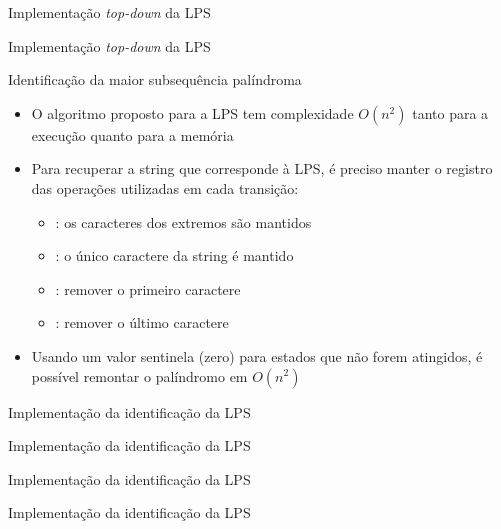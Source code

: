 \begin{frame}[fragile]{Implementação {\it top-down} da LPS}
\end{frame}

\begin{frame}[fragile]{Implementação {\it top-down} da LPS}
\end{frame}

\begin{frame}[fragile]{Identificação da maior subsequência palíndroma}

    \begin{itemize}
        \item O algoritmo proposto para a LPS tem complexidade $O(n^2)$ tanto para a execução 
            quanto para a memória
        \pause

        \item Para recuperar a string que corresponde à LPS, é preciso manter o registro das
            operações utilizadas em cada transição:
            \begin{itemize}
                \item {}: os caracteres dos extremos são mantidos
                \item {}: o único caractere da string é mantido
                \item {}: remover o primeiro caractere 
                \item {}: remover o último caractere 
            \end{itemize}
        \pause

        \item Usando um valor sentinela (zero) para estados que não forem atingidos, é possível
            remontar o palíndromo em $O(n^2)$
    \end{itemize}

\end{frame}

\begin{frame}[fragile]{Implementação da identificação da LPS}
\end{frame}

\begin{frame}[fragile]{Implementação da identificação da LPS}
\end{frame}

\begin{frame}[fragile]{Implementação da identificação da LPS}
\end{frame}

\begin{frame}[fragile]{Implementação da identificação da LPS}
\end{frame}
